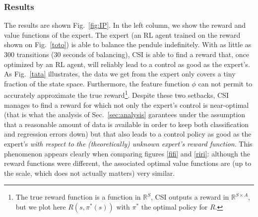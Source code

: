\documentclass[smallextended]{svjour3}
\begin{document}
\subsubsection{Results}
The results are shown Fig.~\ref{fig:IP}. In the left column, we show the reward and value functions of the expert. The expert (an RL agent trained on the  reward shown on Fig.~\ref{toto}) is able to balance the pendule indefinitely. With as little as 300 transitions (30 seconds of balancing), CSI is able to find a reward that, once optimized by an RL agent, will reliably lead to a control as good as the expert's. As Fig.~\ref{tata} illustrates, the data we get from the expert only covers a tiny fraction of the state space. Furthermore, the feature function $\phi$ can not permit to accurately approximate the true reward\footnote{The true reward function is a function in $\mathbb{R}^S$, CSI outputs a reward in $\mathbb{R}^{S\times A}$, but we plot here $R(s,\pi^*(s))$ with $\pi^*$ the optimal policy for $R$.}. Despite these two setbacks, CSI manages to find a reward for which not only the expert's control is near-optimal (that is what the analysis of Sec.~\ref{sec:analysis} garantees under the assumption that a reasonable amount of data is available in order to keep both classification and regression errors down) but that also leads to a control policy as good as the expert's \emph{with respect to the (theoretically) unknown expert's reward function}. This phenomenon appears clearly when comparing figures \ref{fifi} and \ref{riri}: although the reward functions were different, the associated optimal value functions are (up to the scale, which does not actually matters) very similar. 
\end{document}
